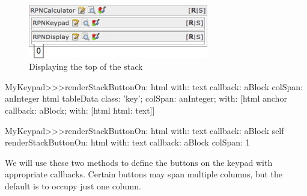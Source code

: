 \documentclass[a4paper,10pt,twoside]{book}
\begin{document}
\begin{figure}[ht]
\begin{center}
\includegraphics[width=0.7\textwidth]{firstStackDisplay}
\caption{Displaying the top of the stack}
\label{fig:firstStackDisplay}
\end{center}
\end{figure}


\begin{code}{}
MyKeypad>>>renderStackButtonOn: html with: text callback: aBlock colSpan: anInteger 
	html tableData
		class: 'key';
		colSpan: anInteger;
		with: 
			[html anchor
				callback: aBlock;
				with: [html html: text]]
\end{code}


\begin{code}{}
MyKeypad>>>renderStackButtonOn: html with: text callback: aBlock 
	self 
		renderStackButtonOn: html
		with: text
		callback: aBlock
		colSpan: 1
\end{code}

We will use these two methods to define the buttons on the keypad with appropriate callbacks.
Certain buttons may span multiple columns, but the default is to occupy just one column.

\end{document}

